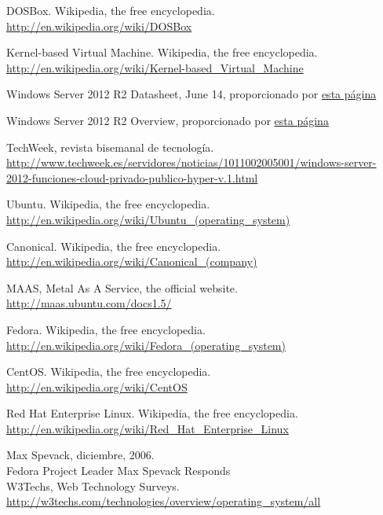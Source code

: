 \documentclass[paper=a4, fontsize=11pt]{scrartcl} %
\numberwithin{equation}{section} %
\numberwithin{figure}{section} %
\numberwithin{table}{section} %
\begin{document}
\begin{thebibliography}{10}
DOSBox. Wikipedia, the free encyclopedia.\\
  \url{http://en.wikipedia.org/wiki/DOSBox}

Kernel-based Virtual Machine. Wikipedia, the free encyclopedia.\\
  \url{http://en.wikipedia.org/wiki/Kernel-based_Virtual_Machine}

Windows Server 2012 R2 Datasheet, June 14, proporcionado por
\href{http://www.microsoft.com/es-es/server-cloud/products/windows-server-2012-r2/}{esta página}

Windows Server 2012 R2 Overview, proporcionado por
\href{http://www.microsoft.com/es-es/server-cloud/products/windows-server-2012-r2/}{esta página}

TechWeek, revista bisemanal de tecnología.\\
  \url{http://www.techweek.es/servidores/noticias/1011002005001/windows-server-2012-funciones-cloud-privado-publico-hyper-v.1.html}

Ubuntu. Wikipedia, the free encyclopedia.\\
  \url{http://en.wikipedia.org/wiki/Ubuntu_(operating_system)}

Canonical. Wikipedia, the free encyclopedia.\\
  \url{http://en.wikipedia.org/wiki/Canonical_(company)}

MAAS, Metal As A Service, the official website.\\
  \url{http://maas.ubuntu.com/docs1.5/}

Fedora. Wikipedia, the free encyclopedia.\\
  \url{http://en.wikipedia.org/wiki/Fedora_(operating_system)}

CentOS. Wikipedia, the free encyclopedia.\\
  \url{http://en.wikipedia.org/wiki/CentOS}

Red Hat Enterprise Linux. Wikipedia, the free encyclopedia.\\
  \url{http://en.wikipedia.org/wiki/Red_Hat_Enterprise_Linux}

Max Spevack, diciembre, 2006.\\
  Fedora Project Leader Max Spevack Responds\\

W3Techs, Web Technology Surveys.\\
  \url{http://w3techs.com/technologies/overview/operating_system/all}


\end{thebibliography}
\end{document}
